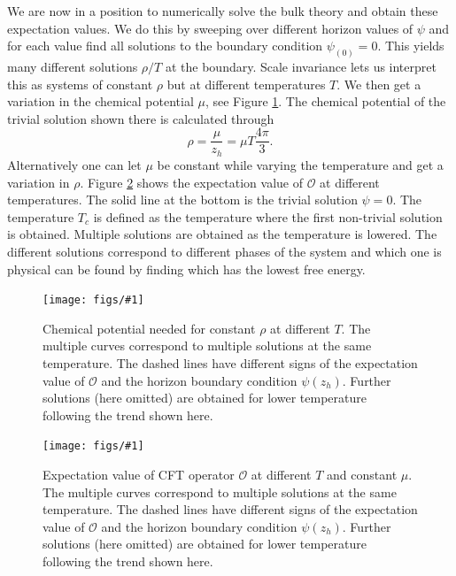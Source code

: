 \documentclass[12pt]{report}
\newcommand{\fig}[2]{
\begin{figure}
\centering
\texttt{[image: figs/\#1]}
\caption{#2}
\end{figure}
}
\begin{document}
We are now in a position to numerically solve the bulk theory and obtain these expectation values. We do this by sweeping over different horizon values of $\psi$ and for each value find all solutions to the boundary condition $\psi_{(0)}=0$. This yields many different solutions $\rho/T$ at the boundary. Scale invariance lets us interpret this as systems of constant $\rho$ but at different temperatures $T$. We then get a variation in the chemical potential $\mu$, see Figure \ref{f:mu}. The chemical potential of the trivial solution shown there is calculated through
\begin{equation}
 \rho=\frac{\mu}{z_h}=\mu T\frac{4\pi}{3}.\label{muTdep}
\end{equation}
Alternatively one can let $\mu$ be constant while varying the temperature and get a variation in $\rho$. Figure \ref{f:O} shows the expectation value of $\mathcal{O}$ at different temperatures. The solid line at the bottom is the trivial solution $\psi=0$. The temperature $T_c$ is defined as the temperature where the first non-trivial solution is obtained. Multiple solutions are obtained as the temperature is lowered. The different solutions correspond to different phases of the system and which one is physical can be found by finding which has the lowest free energy.

\fig{mu_constRho_a2_0.0.pdf}{
Chemical potential needed for constant $\rho$ at different $T$. The multiple curves correspond to multiple solutions at the same temperature. The dashed lines have different signs of the expectation value of $\mathcal{O}$ and the horizon boundary condition $\psi(z_h)$. Further solutions (here omitted) are obtained for lower temperature following the trend shown here.\label{f:mu}
}

\fig{O_constRho_a2_0.0.pdf}{Expectation value of CFT operator $\mathcal{O}$ at different $T$ and constant $\mu$. The multiple curves correspond to multiple solutions at the same temperature. The dashed lines have different signs of the expectation value of $\mathcal{O}$ and the horizon boundary condition $\psi(z_h)$. Further solutions (here omitted) are obtained for lower temperature following the trend shown here.\label{f:O}}
\end{document}

